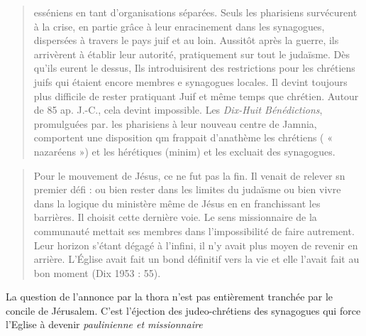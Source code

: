 \begin{quote}
esséniens en tant d'organisations séparées. Seuls les pharisiens
survécurent à la crise, en partie grâce à leur enracinement dans les
synagogues, dispersées à travers le pays juif et au loin. Aussitôt après
la guerre, ils arrivèrent à établir leur autorité, pratiquement sur tout le
judaïsme. Dès qu'ils eurent le dessus, Ils introduisirent des restrictions
pour les chrétiens juifs qui étaient encore membres e synagogues
locales. Il devint toujours plus difficile de rester pratiquant Juif et
même temps que chrétien. Autour de 85 ap. J.-C., cela devint
impossible. Les \textit{Dix-Huit Bénédictions}, promulguées par. les pharisiens
à leur nouveau centre de Jamnia, comportent une disposition qm
frappait d'anathème les chrétiens ( « nazaréens ») et les hérétiques
(minim) et les excluait des synagogues.
\end{quote}

\begin{quote}
    Pour le mouvement de Jésus, ce ne fut pas la fin. Il venait de relever
sn premier défi : ou bien rester dans les limites du judaïsme ou bien
vivre dans la logique du ministère même de Jésus en en franchissant
les barrières. Il choisit cette dernière voie. Le sens missionnaire de la
communauté mettait ses membres dans l'impossibilité de faire autrement.
Leur horizon s'étant dégagé à l'infini, il n'y avait plus moyen
de revenir en arrière. L'Église avait fait un bond définitif vers la vie et
elle l'avait fait au bon moment (Dix 1953 : 55).
    
\end{quote}
\begin{Synthesis}
La question de l'annonce par la thora n'est pas entièrement tranchée par le concile de Jérusalem. C'est l'éjection des judeo-chrétiens des synagogues qui force l'Eglise à devenir \textit{paulinienne et missionnaire}
\end{Synthesis}

